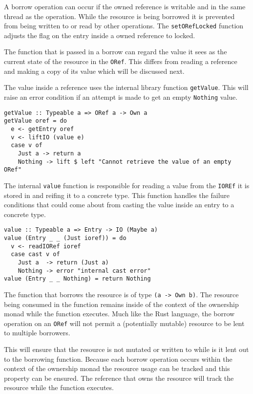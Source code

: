 \documentclass[onehalf,11pt]{beavtex}
\begin{document}
A borrow operation can occur if the owned reference is writable and
in the same thread as the operation.
While the resource is being borrowed it is prevented from being written to or
read by other operations. The \texttt{setORefLocked} function adjusts the flag
on the entry inside a owned reference to locked.

The function that is passed in a borrow can regard the value it sees as the
current state of the resource in the \texttt{ORef}. This differs from reading a
reference and making a copy of its value which will be discussed next.

The value inside a reference uses the internal library function
\texttt{getValue}. This will raise an error condition if an
attempt is made to get an empty \texttt{Nothing} value.

\begin{verbatim}
getValue :: Typeable a => ORef a -> Own a
getValue oref = do
  e <- getEntry oref
  v <- liftIO (value e)
  case v of
    Just a -> return a
    Nothing -> lift $ left "Cannot retrieve the value of an empty ORef"
\end{verbatim}

The internal \texttt{value} function is responsible for reading a value from
the \texttt{IOREf} it is stored in and reifing it to a concrete type.
This function handles the failure conditions that could come
about from casting the value inside an entry to a concrete type.

\begin{verbatim}
value :: Typeable a => Entry -> IO (Maybe a)
value (Entry _ _ (Just ioref)) = do
  v <- readIORef ioref
  case cast v of
    Just a  -> return (Just a)
    Nothing -> error "internal cast error"
value (Entry _ _ Nothing) = return Nothing
\end{verbatim}

The function that borrows the resource is of type \texttt{(a -> Own b)}. The
resource being consumed in the function remains inside of the context of the
ownership monad while the function executes.
Much like the Rust language, the borrow operation on an \texttt{ORef} will not
permit a (potentially mutable) resource to be lent to multiple borrowers.

This will ensure that the resource is not mutated or written to while is it lent
out to the borrowing function.
Because each borrow operation occurs within the context of the ownership monad
the resource usage can be tracked and this property can be ensured. The
reference that owns the resource will track the resource while the function
executes.
\end{document}
